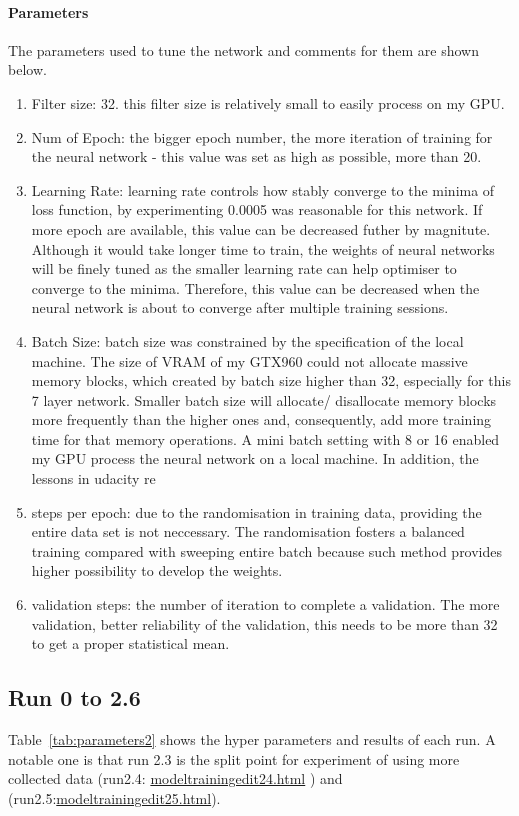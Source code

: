 \documentclass[paper=a4, fontsize=11pt]{scrartcl} %
\numberwithin{equation}{section} %
\numberwithin{figure}{section} %
\numberwithin{table}{section} %
\begin{document}
\paragraph{Parameters}
The parameters used to tune the network and comments for them are shown below.
\begin{enumerate}
	\item Filter size: 32. this filter size is relatively small to easily process on my GPU.
	\item Num of Epoch: the bigger epoch number, the more iteration of training for the neural network - this value was set as high as possible, more than 20.	
	\item Learning Rate: learning rate controls how stably converge to the minima of loss function, by experimenting 0.0005 was reasonable for this network. If more epoch are available, this value can be decreased futher by magnitute. Although it would take longer time to train, the weights of neural networks will be finely tuned as the smaller learning rate can help optimiser to converge to the minima. Therefore, this value can be decreased when the neural network is about to converge after multiple training sessions.
	\item Batch Size: batch size was constrained by the specification of the local machine. The size of VRAM of my GTX960 could not allocate massive memory blocks, which created by batch size higher than 32, especially for this 7 layer network. Smaller batch size will allocate/ disallocate memory blocks more frequently than the higher ones and, consequently, add more training time for that memory operations. A mini batch setting with 8 or 16 enabled my GPU process the neural network on a local machine. In addition, the lessons in udacity re
	\item steps per epoch: due to the randomisation in training data, providing the entire data set is not neccessary. The randomisation fosters a balanced training compared with sweeping entire batch because such method provides higher possibility to develop the weights.
	\item validation steps: the number of iteration to complete a validation. The more validation, better reliability of the validation, this needs to be more than 32 to get a proper statistical mean.
\end{enumerate}

\subsection{Run 0 to 2.6}
Table~\ref{tab:parameters2} shows the hyper parameters and results of each run. A notable one is that run 2.3 is the split point for experiment of using more collected data (run2.4: \href{run:./JupyterNotebooks/modeltrainingedit24.html}{modeltrainingedit24.html} ) and (run2.5:\href{run:./JupyterNotebooks/modeltrainingedit25.html}{modeltrainingedit25.html}).
\end{document}
